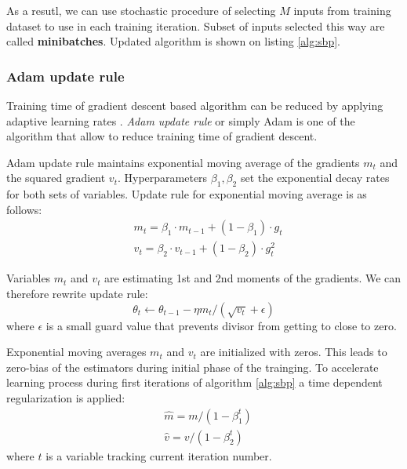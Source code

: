 As a resutl, we can use stochastic procedure of selecting $M$ inputs from training dataset to use in each training iteration.
Subset of inputs selected this way are called \textbf{minibatches}. Updated algorithm is shown on listing \ref{alg:sbp}.



\subsubsection{Adam update rule}

Training time of gradient descent based algorithm can be reduced by applying adaptive learning rates \cite{Kingma2015}.
\textit{Adam update rule} or simply Adam is one of the algorithm that allow to reduce training time of gradient descent.

Adam update rule maintains exponential moving average of the gradients $m_t$ and the squared gradient $v_t$.
Hyperparameters $\beta_1, \beta_2$ set the exponential decay rates for both sets of variables.
Update rule for exponential moving average is as follows:
\begin{equation*}
  \begin{aligned}
    & m_t = \beta_1 \cdot m_{t-1} + (1-\beta_1) \cdot g_t \\
    & v_t = \beta_2 \cdot v_{t-1} + (1-\beta_2) \cdot g_t^2
  \end{aligned}
\end{equation*}

Variables $m_t$ and $v_t$ are estimating 1st and 2nd moments of the gradients.
We can therefore rewrite update rule:
\begin{equation}
  \theta_t \gets \theta_{t-1} - \eta m_t / (\sqrt{v_t} + \epsilon)
\end{equation}
where $\epsilon$ is a small guard value that prevents divisor from getting to close to zero.

Exponential moving averages $m_t$ and $v_t$ are initialized with zeros.
This leads to zero-bias of the estimators during initial phase of the trainging.
To accelerate learning process during first iterations of algorithm \ref{alg:sbp} a time dependent regularization is applied:
\begin{equation*}
  \begin{aligned}
    & \hat{m} = m / (1-\beta_1^t) \\
    & \hat{v} = v/(1-\beta_2^t)
  \end{aligned}
\end{equation*}
where $t$ is a variable tracking current iteration number.

